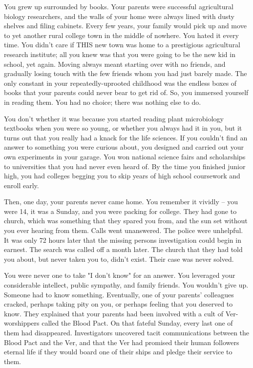 \documentclass[char]{guildcamp4}
\begin{document}
\name{\cSpite{}}

You grew up surrounded by books. Your parents were successful agricultural biology researchers, and the walls of your home were always lined with dusty shelves and filing cabinets. Every few years, your family would pick up and move to yet another rural college town in the middle of nowhere. You hated it every time. You didn't care if THIS new town was home to a prestigious agricultural research institute; all you knew was that you were going to be the new kid in school, yet again. Moving always meant starting over with no friends, and gradually losing touch with the few friends whom you had just barely made. The only constant in your repeatedly-uprooted childhood was the endless boxes of books that your parents could never bear to get rid of. So, you immersed yourself in reading them. You had no choice; there was nothing else to do.

You don't whether it was because you started reading plant microbiology textbooks when you were so young, or whether you always had it in you, but it turns out that you really had a knack for the life sciences. If you couldn't find an answer to something you were curious about, you designed and carried out your own experiments in your garage. You won national science fairs and scholarships to universities that you had never even heard of. By the time you finished junior high, you had colleges begging you to skip years of high school coursework and enroll early. 

Then, one day, your parents never came home. You remember it vividly -- you were 14, it was a Sunday, and you were packing for college. They had gone to church, which was something that they spared you from, and the sun set without you ever hearing from them. Calls went unanswered. The police were unhelpful. It was only 72 hours later that the missing persons investigation could begin in earnest. The search was called off a month later. The church that they had told you about, but never taken you to, didn't exist. Their case was never solved.

You were never one to take "I don't know" for an answer. You leveraged your considerable intellect, public sympathy, and family friends. You wouldn't give up. Someone had to know something. Eventually, one of your parents' colleagues cracked, perhaps taking pity on you, or perhaps feeling that you deserved to know. They explained that your parents had been involved with a cult of Ver-worshippers called the Blood Pact. On that fateful Sunday, every last one of them had disappeared. Investigators uncovered tacit communications between the Blood Pact and the Ver, and that the Ver had promised their human followers eternal life if they would board one of their ships and pledge their service to them. 
\end{document}
